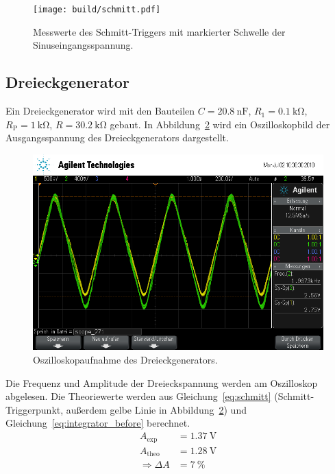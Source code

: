\begin{figure}[ht]
  \centering
    \centering
    \texttt{[image: build/schmitt.pdf]}
    \caption{Messwerte des Schmitt-Triggers mit markierter Schwelle der Sinuseingangsspannung.}
    \label{fig:schmitt_plot}
  \label{fig:schmitt}
\end{figure}

\subsection{Dreieckgenerator}
Ein Dreieckgenerator wird mit den Bauteilen
$C = \SI{20.8}{\nano\farad}$,
$R_1 = \SI{0.1}{\kilo\ohm}$,
$R_\text{P} = \SI{1}{\kilo\ohm}$,
$R = \SI{30.2}{\kilo\ohm}$
gebaut.
In Abbildung~\ref{fig:dreieck_generator} wird ein Oszilloskopbild
der Ausgangsspannung des Dreieckgenerators dargestellt.
\begin{figure}[ht]
  \centering
  \includegraphics[height=0.3\textheight]{data/scope_271.png}
  \caption{Oszilloskopaufnahme des Dreieckgenerators.}
  \label{fig:dreieck_generator}
\end{figure}

Die Frequenz und Amplitude der Dreieckspannung werden am Oszilloskop abgelesen.
Die Theoriewerte werden aus Gleichung~\eqref{eq:schmitt} (Schmitt-Triggerpunkt, außerdem gelbe Linie in Abbildung~\ref{fig:dreieck_generator})
und Gleichung~\eqref{eq:integrator_before} berechnet.
\begin{align*}
  A_\text{exp} &= \SI{1.37}{\volt} \\
  A_\text{theo} &= \SI{1.28}{\volt} \\
  \Rightarrow \Delta A &= \SI{7}{\percent}
\end{align*}

